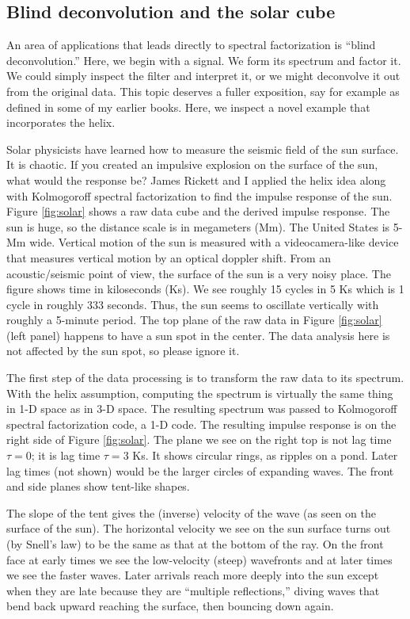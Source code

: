 \subsection{Blind deconvolution and the solar cube}
An area of applications that leads directly to spectral factorization
is ``blind deconvolution.''
Here, we begin with a signal.
We form its spectrum and factor it.
We could simply inspect the filter and interpret it,
or we might deconvolve it out from the original data.
This topic deserves a fuller exposition, say for example
as defined in some of my earlier books.
Here, we inspect a novel example that incorporates the helix.
\par
Solar physicists have learned how to measure
the seismic field of the sun surface.  It is chaotic.
If you created an impulsive explosion on the surface of the sun,
what would the response be?
James Rickett and I applied the helix idea along with Kolmogoroff
spectral factorization to find the impulse response of the sun.
Figure \ref{fig:solar} shows a raw data cube and the derived impulse response.
The sun is huge, so the distance scale is in megameters (Mm).
The United States is 5-Mm wide.
Vertical motion of the sun is measured with a videocamera-like device
that measures vertical motion by an optical doppler shift.
From an acoustic/seismic point of view,
the surface of the sun is a very noisy place.
The figure shows time in kiloseconds (Ks).
We see roughly 15 cycles in 5 Ks which is 1 cycle in roughly 333 seconds.
Thus, the sun seems to oscillate vertically with roughly a 5-minute period.
The top plane of the raw data
in Figure \ref{fig:solar} (left panel)
happens to have a sun spot in the center.
The data analysis here is not affected by the sun spot, so please ignore it.
\par
The first step of the data processing is
to transform the raw data to its spectrum.
With the helix assumption, computing the spectrum is
virtually the same thing in 1-D space as in 3-D space.
The resulting spectrum was passed to Kolmogoroff spectral factorization code,
a 1-D code.
The resulting impulse response is on the right side of 
Figure \ref{fig:solar}.
The plane we see on the right top is not lag time $\tau=0$;
it is lag time $\tau=3$ Ks.
It shows circular rings, as ripples on a pond.
Later lag times (not shown) would be the larger circles of expanding waves.
The front and side planes show tent-like shapes.
\par
The slope of the tent gives the (inverse) velocity of the wave
(as seen on the surface of the sun).
The horizontal velocity we see on the sun surface turns out
(by Snell's law)
to be the same as that at the bottom of the ray.
On the front face at early times we see the low-velocity (steep) wavefronts
and at later times we see the faster waves.
Later arrivals reach more deeply into the sun
except when they are late because they are ``multiple reflections,''
diving waves that bend back upward reaching the surface,
then bouncing down again.


